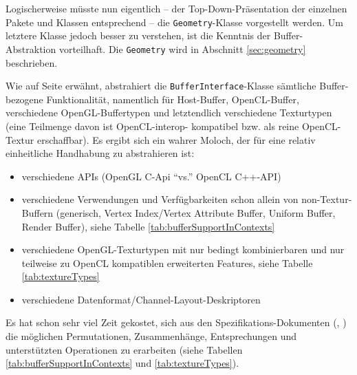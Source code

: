 \label{sec:architecture:BufferAbstraction} 	

	Logischerweise müsste nun eigentlich 
	-- der Top-Down-Präsentation der einzelnen Pakete und Klassen entsprechend --
	die \lstinline|Geometry|-Klasse vorgestellt werden. Um letztere Klasse jedoch besser zu verstehen,
	ist die Kenntnis der Buffer-Abstraktion vorteilhaft. Die \lstinline|Geometry| wird in Abschnitt
	\ref{sec:geometry} beschrieben.
	
	Wie auf Seite \pageref{overview:bufferAbstraction} erwähnt, abstrahiert die \lstinline|BufferInterface|-Klasse
	sämtliche Buffer-bezogene Funktionalität, namentlich für Host-Buffer, OpenCL-Buffer, 
	verschiedene OpenGL-Buffertypen und letztendlich verschiedene Texturtypen (eine Teilmenge davon ist OpenCL-interop-
	kompatibel bzw. als reine OpenCL-Textur erschaffbar).
	Es ergibt sich ein wahrer Moloch, der für eine relativ einheitliche Handhabung zu abstrahieren ist: 
	
	\begin{itemize}
		\item verschiedene APIs (OpenGL C-Api "`vs."' OpenCL C++-API)
		\item verschiedene Verwendungen und Verfügbarkeiten schon allein von non-Textur-Buffern 
			(generisch, Vertex Index/Vertex Attribute Buffer, Uniform Buffer, Render Buffer),
			siehe Tabelle \ref{tab:bufferSupportInContexts}
		\item verschiedene OpenGL-Texturtypen mit nur bedingt kombinierbaren und nur teilweise zu OpenCL kompatiblen 
			erweiterten  Features, siehe Tabelle \ref{tab:textureTypes} 
		\item verschiedene Datenformat/Channel-Layout-Deskriptoren %
	\end{itemize}	
	
	Es hat schon sehr viel Zeit gekostet, sich aus den Spezifikations-Dokumenten 
	(\cite{openGL_4_1_Spec}, \cite{openCL_1_0_Spec}) die möglichen Permutationen, Zusammenhänge, Entsprechungen
	und unterstützten Operationen zu erarbeiten 
	(siehe Tabellen \ref{tab:bufferSupportInContexts} und \ref{tab:textureTypes}).
	
